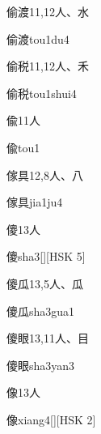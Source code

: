 \begin{entry}{偷渡}{11,12}{⼈、⽔}
  \begin{phonetics}{偷渡}{tou1du4}
  \end{phonetics}
\end{entry}

\begin{entry}{偷税}{11,12}{⼈、⽲}
  \begin{phonetics}{偷税}{tou1shui4}
  \end{phonetics}
\end{entry}

\begin{entry}{偸}{11}{⼈}
  \begin{phonetics}{偸}{tou1}
  \end{phonetics}
\end{entry}

\begin{entry}{傢具}{12,8}{⼈、⼋}
  \begin{phonetics}{傢具}{jia1ju4}
  \end{phonetics}
\end{entry}

\begin{entry}{傻}{13}{⼈}
  \begin{phonetics}{傻}{sha3}[][HSK 5]
  \end{phonetics}
\end{entry}

\begin{entry}{傻瓜}{13,5}{⼈、⽠}
  \begin{phonetics}{傻瓜}{sha3gua1}
  \end{phonetics}
\end{entry}

\begin{entry}{傻眼}{13,11}{⼈、⽬}
  \begin{phonetics}{傻眼}{sha3yan3}
  \end{phonetics}
\end{entry}

\begin{entry}{像}{13}{⼈}
  \begin{phonetics}{像}{xiang4}[][HSK 2]
  \end{phonetics}
\end{entry}

